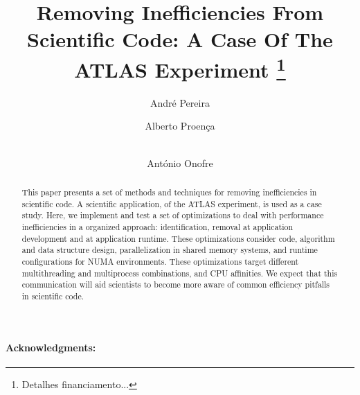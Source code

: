 \documentclass[runningheads,a4paper]{llncs}
\begin{document}
\title{Removing Inefficiencies From Scientific Code: A Case Of The ATLAS Experiment 
\thanks{Detalhes financiamento...}}




%
%
\author{André Pereira \and Alberto Proença \and \\ António Onofre }
%



\maketitle              %

\begin{abstract}

This paper presents a set of methods and techniques for removing inefficiencies in scientific code. A scientific application, of the ATLAS experiment, is used as a case study. Here, we implement and test a set of optimizations to deal with performance inefficiencies in a organized approach: identification, removal at application development and at application runtime. These optimizations consider code, algorithm and data structure design, parallelization in shared memory systems, and runtime configurations for NUMA environments. These optimizations target different multithreading and multiprocess combinations, and CPU affinities. We expect that this communication will aid scientists to become more aware of common efficiency pitfalls in scientific code.

\end{abstract}
%








\paragraph{Acknowledgments:}




\end{document}
